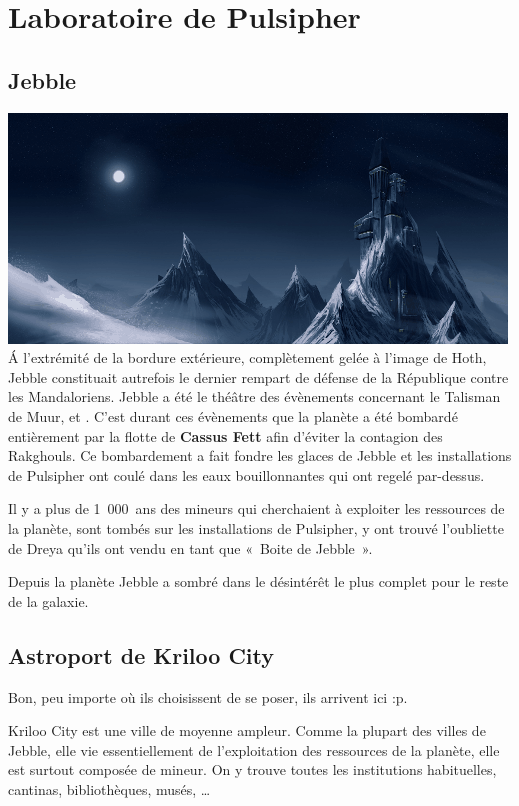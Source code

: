\section{Laboratoire de Pulsipher}

\subsection{Jebble}\label{sec:jebble}
\noindent\includegraphics[width=\linewidth]{_img/places/jebble.png}
\'A l’extrémité de la bordure extérieure, complètement gelée à l’image de Hoth, Jebble constituait autrefois le dernier rempart de défense de la République contre les Mandaloriens. Jebble a été le théâtre des évènements concernant le Talisman de Muur,  et . C’est durant ces évènements que la planète a été bombardé entièrement par la flotte de \textbf{Cassus Fett} afin d’éviter la contagion des Rakghouls. Ce bombardement a fait fondre les glaces de Jebble et les installations de Pulsipher ont coulé dans les eaux bouillonnantes qui ont regelé par-dessus.

Il y a plus de 1~000~ans des mineurs qui cherchaient à exploiter les ressources de la planète, sont tombés sur les installations de Pulsipher, y ont trouvé l’oubliette de Dreya qu’ils ont vendu en tant que «~Boite de Jebble~».

Depuis la planète Jebble a sombré dans le désintérêt le plus complet pour le reste de la galaxie.

\subsection{Astroport de Kriloo City}
Bon, peu importe où ils choisissent de se poser, ils arrivent ici :p.

Kriloo City est une ville de moyenne ampleur. Comme la plupart des villes de Jebble, elle vie essentiellement de l’exploitation des ressources de la planète, elle est surtout composée de mineur. On y trouve toutes les institutions habituelles, cantinas, bibliothèques, musés, \ldots

